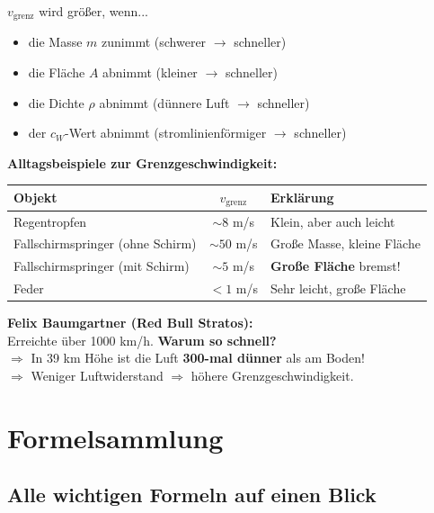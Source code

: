 \documentclass[11pt,a4paper]{article}
\begin{document}
\begin{merksatz}
$v_{\text{grenz}}$ wird größer, wenn...
\begin{itemize}
\item die Masse $m$ zunimmt (schwerer $\rightarrow$ schneller)
\item die Fläche $A$ abnimmt (kleiner $\rightarrow$ schneller)
\item die Dichte $\rho$ abnimmt (dünnere Luft $\rightarrow$ schneller)
\item der $c_W$-Wert abnimmt (stromlinienförmiger $\rightarrow$ schneller)
\end{itemize}
\end{merksatz}

\begin{beispiel}
\textbf{Alltagsbeispiele zur Grenzgeschwindigkeit:}

\begin{tabular}{|l|c|l|}
\hline
\rowcolor{lightblue}
\textbf{Objekt} & $v_{\text{grenz}}$ & \textbf{Erklärung} \\
\hline
Regentropfen & $\sim 8$ m/s & Klein, aber auch leicht \\
\hline
Fallschirmspringer (ohne Schirm) & $\sim 50$ m/s & Große Masse, kleine Fläche \\
\hline
Fallschirmspringer (mit Schirm) & $\sim 5$ m/s & \textbf{Große Fläche} bremst! \\
\hline
Feder & $< 1$ m/s & Sehr leicht, große Fläche \\
\hline
\end{tabular}

\vspace{0.3cm}
\textbf{Felix Baumgartner (Red Bull Stratos):}\\
Erreichte über 1000 km/h. \textbf{Warum so schnell?}\\
$\Rightarrow$ In 39 km Höhe ist die Luft \textbf{300-mal dünner} als am Boden!\\
$\Rightarrow$ Weniger Luftwiderstand $\Rightarrow$ höhere Grenzgeschwindigkeit.
\end{beispiel}

\newpage
\section{Formelsammlung}

\subsection{Alle wichtigen Formeln auf einen Blick}
\end{document}
